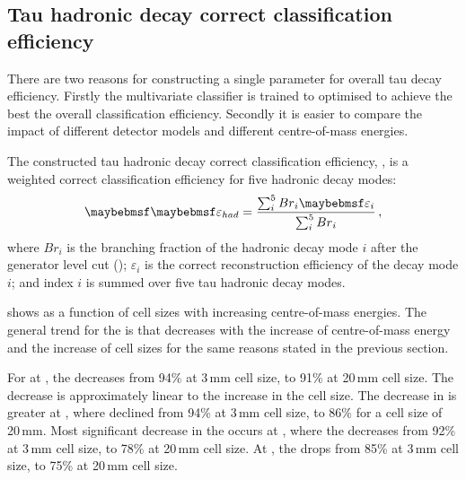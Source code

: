 \subsection{Tau hadronic decay correct classification efficiency}

There are two reasons for constructing a single parameter for  overall tau decay efficiency. Firstly the multivariate classifier is trained to optimised to achieve the best the overall classification efficiency. Secondly it is easier to compare the impact of different detector models and different centre-of-mass energies.

The constructed tau hadronic decay correct classification efficiency, \tauHad, is a weighted correct classification efficiency for five hadronic decay modes:
\begin{equation}
\label{eq:had}
\tauHad = \frac{\sum_{i}^5 {Br}_{i}\varepsilon_{i}}{\sum_{i}^5 {Br}_{i}}  \,,
\end{equation}
where $Br_{i}$ is the branching fraction of the hadronic decay mode $i$  after the generator level cut (); $\varepsilon_{i}$ is the correct reconstruction efficiency of the decay mode $i$; and index $i$ is summed over five tau hadronic decay modes.

 shows \tauHad as a function of \ECAL cell sizes with increasing centre-of-mass energies. The general trend for the \tauHad is that \tauHad decreases with the increase of centre-of-mass energy and the increase of \ECAL cell sizes for the same reasons stated in the previous section.


For \tauHad at , the \tauHad decreases from 94\% at 3\,mm cell size, to 91\% at 20\,mm cell size. The decrease is approximately linear to the increase in the cell size. The decrease in \tauHad is greater at , where \tauHad declined from 94\% at 3\,mm cell size, to 86\% for a \ECAL cell size of  20\,mm. Most significant decrease in the \tauHad occurs at  , where the \tauHad decreases from 92\% at 3\,mm cell size, to 78\% at 20\,mm cell size. At , the \tauHad drops from 85\% at 3\,mm cell size, to 75\% at 20\,mm cell size.


